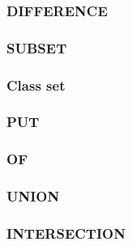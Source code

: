 

\subsubsection{DIFFERENCE}\label{difference}



\subsubsection{SUBSET}\label{subset}



\subsubsection{Class set}\label{class-set}



\subsubsection{PUT}\label{put-2}



\subsubsection{OF}\label{of-1}



\subsubsection{UNION}\label{union-1}



\subsubsection{INTERSECTION}\label{intersection-1}

